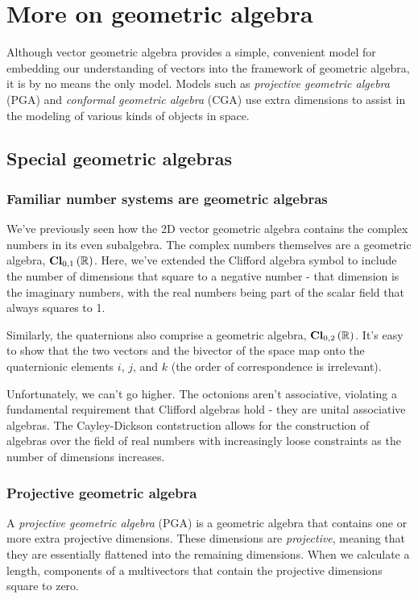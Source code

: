 \chapter{More on geometric algebra}

Although vector geometric algebra provides a simple, convenient model for embedding our
understanding of vectors into the framework of geometric algebra, it is by no means the only model.
Models such as \textit{projective geometric algebra} (PGA) and \textit{conformal geometric algebra}
(CGA) use extra dimensions to assist in the modeling of various kinds of objects in space.

\section{Special geometric algebras}

\subsection{Familiar number systems are geometric algebras}

We've previously seen how the 2D vector geometric algebra contains the complex numbers in its even
subalgebra. The complex numbers themselves are a geometric algebra, $\operatorname{\mathbf{Cl}}_{0,1}\left(\mathbb{R}\right)$. Here,
we've extended the Clifford algebra symbol to include the number of dimensions that square to a
negative number - that dimension is the imaginary numbers, with the real numbers being part of the
scalar field that always squares to 1.

Similarly, the quaternions also comprise a geometric algebra, $\operatorname{\mathbf{Cl}}_{0,2}\left(\mathbb{R}\right)$. It's easy to show that
the two vectors and the bivector of the space map onto the quaternionic elements $i$, $j$, and $k$
(the order of correspondence is irrelevant).

Unfortunately, we can't go higher. The octonions aren't associative, violating a fundamental
requirement that Clifford algebras hold - they are unital associative algebras. The Cayley-Dickson
contstruction allows for the construction of algebras over the field of real numbers with
increasingly loose constraints as the number of dimensions increases.

\subsection{Projective geometric algebra}

A \textit{projective geometric algebra} (PGA) is a geometric algebra that contains one or more extra
projective dimensions. These dimensions are \textit{projective}, meaning that they are essentially
flattened into the remaining dimensions. When we calculate a length, components of a multivectors
that contain the projective dimensions square to zero.

